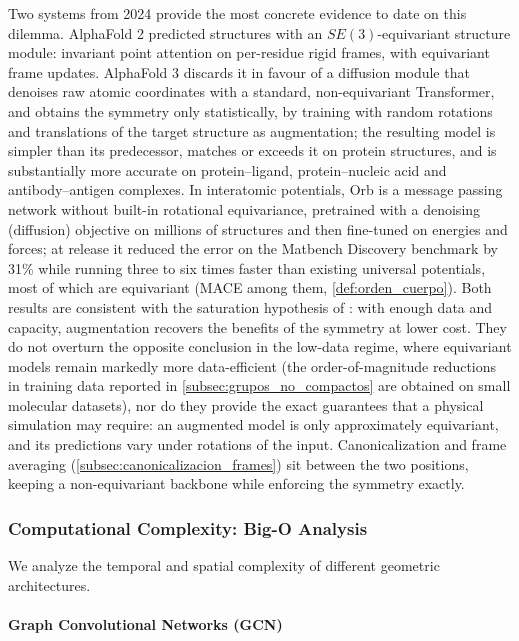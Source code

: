 Two systems from 2024 provide the most concrete evidence to date on this dilemma. AlphaFold 2 predicted structures with an $SE(3)$-equivariant structure module: invariant point attention on per-residue rigid frames, with equivariant frame updates. AlphaFold 3 \citep{abramson2024alphafold3} discards it in favour of a diffusion module that denoises raw atomic coordinates with a standard, non-equivariant \gls{Transformer}, and obtains the symmetry only statistically, by training with random rotations and translations of the target structure as augmentation; the resulting model is simpler than its predecessor, matches or exceeds it on protein structures, and is substantially more accurate on protein--ligand, protein--nucleic acid and antibody--antigen complexes. In interatomic potentials, Orb \citep{neumann2024orb} is a message passing network without built-in rotational equivariance, pretrained with a denoising (diffusion) objective on millions of structures and then fine-tuned on energies and forces; at release it reduced the error on the Matbench Discovery benchmark by 31\% while running three to six times faster than existing universal potentials, most of which are equivariant (MACE among them, \autoref{def:orden_cuerpo}). Both results are consistent with the saturation hypothesis of \citet{park2024equivariancescale}: with enough data and capacity, augmentation recovers the benefits of the symmetry at lower cost. They do not overturn the opposite conclusion in the low-data regime, where equivariant models remain markedly more data-efficient (the order-of-magnitude reductions in training data reported in \autoref{subsec:grupos_no_compactos} are obtained on small molecular datasets), nor do they provide the exact guarantees that a physical simulation may require: an augmented model is only approximately equivariant, and its predictions vary under rotations of the input. Canonicalization and frame averaging (\autoref{subsec:canonicalizacion_frames}) sit between the two positions, keeping a non-equivariant backbone while enforcing the symmetry exactly.

\subsubsection{Computational Complexity: Big-O Analysis}

We analyze the temporal and spatial complexity of different geometric architectures.

\paragraph{Graph Convolutional Networks (GCN)}

